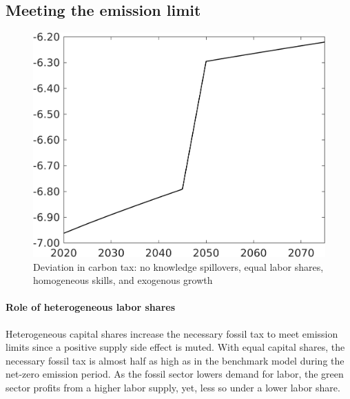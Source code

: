 \clearpage
\subsection{Meeting the emission limit}\label{app:neccab}

\begin{figure}[h!!]
	\centering
	\caption{\footnotesize{ Deviation in carbon tax: no knowledge spillovers, equal labor shares, homogeneous skills, and exogenous growth}}\label{fig:zeromod_tauf}
	\begin{minipage}[]{0.4\textwidth}
		\centering
		\includegraphics[width=1\textwidth]{../../codding_model/own_basedOnFried/optimalPol_010922_revision/figures/all_13Sept22/CompTaufPER_bytaul_Equlab_Reg5_tauf_spillover0_nsk1_xgr1_knspil1_sep0_LFlimit1_emsbase0_countec0_GovRev0_etaa0.79_lgd0.png} 
	\end{minipage}		
\end{figure} 



\paragraph{Role of heterogeneous labor shares}
Heterogeneous capital shares increase the necessary fossil tax to meet emission limits since a positive supply side effect is muted. 
With equal capital shares, the necessary fossil tax is almost half as high as in the benchmark model during the net-zero emission period. 
As the fossil sector lowers demand for labor, the green sector profits from a higher labor supply, yet, less so under a lower labor share.  

